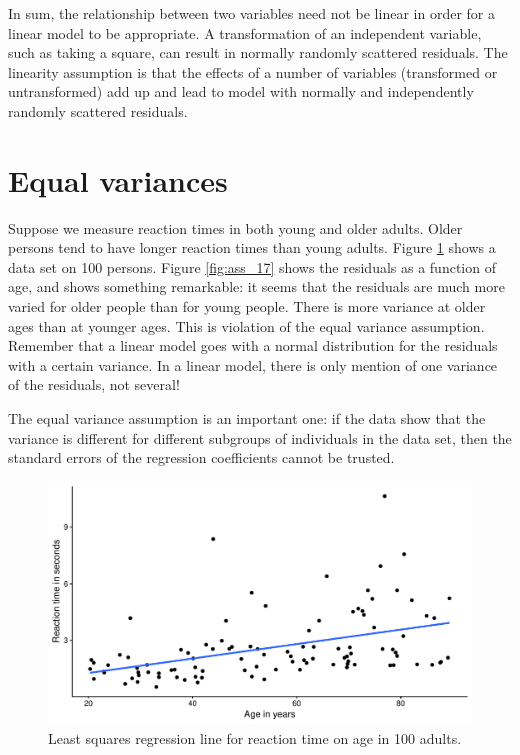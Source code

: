 \documentclass[]{book}\usepackage[]{graphicx}\usepackage[]{color}
\makeatletter
\def\maxwidth{ %
  \ifdim\Gin@nat@width>\linewidth
    \linewidth
  \else
    \Gin@nat@width
  \fi
}
\newenvironment{knitrout}{}{} %
\makeatother
\begin{document}
In sum, the relationship between two variables need not be linear in order for a linear model to be appropriate. A transformation of an independent variable, such as taking a square, can result in normally randomly scattered residuals. The linearity assumption is that the effects of a number of variables (transformed or untransformed) add up and lead to model with normally and  independently randomly scattered residuals.


\section{Equal variances}

Suppose we measure reaction times in both young and older adults. Older persons tend to have longer reaction times than young adults. Figure \ref{fig:ass_16} shows a data set on 100 persons. Figure \ref{fig:ass_17} shows the residuals as a function of age, and shows something remarkable: it seems that the residuals are much more varied for older people than for young people. There is more variance at older ages than at younger ages. This is violation of the equal variance assumption. Remember that a linear model goes with a normal distribution for the residuals with a certain variance. In a linear model, there is only mention of one variance of the residuals, not several!

The equal variance assumption is an important one: if the data show that the variance is different for different subgroups of individuals in the data set, then the standard errors of the regression coefficients cannot be trusted. 

\begin{knitrout}
\color{fgcolor}\begin{figure}

{\centering \includegraphics[width=\maxwidth]{figure/ass_16-1} 

}

\caption[Least squares regression line for reaction time on age in 100 adults]{Least squares regression line for reaction time on age in 100 adults.}\label{fig:ass_16}
\end{figure}


\end{knitrout}
\end{document}
